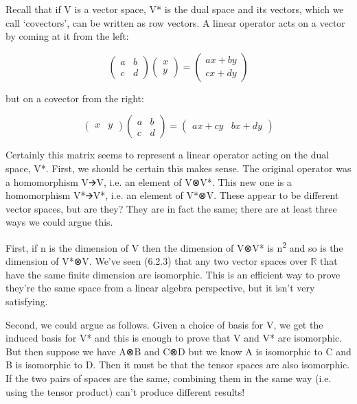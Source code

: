 \documentclass[oneside,english]{amsbook}
\numberwithin{section}{chapter}
\theoremstyle{plain}
\theoremstyle{definition}
\begin{document}
Recall that if V is a vector space, V* is the dual space and its
vectors, which we call `covectors', can be written as row vectors. A
linear operator acts on a vector by coming at it from the left:

\[\begin{pmatrix}
	a & b \\
	c & d
\end{pmatrix}\begin{pmatrix}
	x \\
	y
\end{pmatrix} = \begin{pmatrix}
	ax + by \\
	cx + dy
\end{pmatrix}\]

but on a covector from the right:

\[\begin{pmatrix}
	x & y
\end{pmatrix}\begin{pmatrix}
	a & b \\
	c & d
\end{pmatrix} = \begin{pmatrix}
	ax + cy & bx + dy
\end{pmatrix}\]

Certainly this matrix seems to represent a linear operator acting on the
dual space, V*. First, we should be certain this makes sense. The
original operator was a homomorphism V🡪V, i.e. an element of V⊗V*. This
new one is a homomorphism V*🡪V*, i.e. an element of V*⊗V. These appear
to be different vector spaces, but are they? They are in fact the same;
there are at least three ways we could argue this.

First, if n is the dimension of V then the dimension of V⊗V* is
n\textsuperscript{2} and so is the dimension of V*⊗V. We've seen (6.2.3)
that any two vector spaces over $\mathbb{R}$ that have the same finite
dimension are isomorphic. This is an efficient way to prove they're the
same space from a linear algebra perspective, but it isn't very
satisfying.

Second, we could argue as follows. Given a choice of basis for V, we get
the induced basis for V* and this is enough to prove that V and V* are
isomorphic. But then suppose we have A⊗B and C⊗D but we know A is
isomorphic to C and B is isomorphic to D. Then it must be that the
tensor spaces are also isomorphic. If the two pairs of spaces are the
same, combining them in the same way (i.e. using the tensor product)
can't produce different results!
\end{document}

